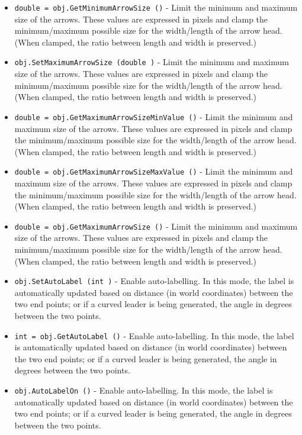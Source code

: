 \begin{itemize}
\item  \verb|double = obj.GetMinimumArrowSize ()| -  Limit the minimum and maximum size of the arrows. These values are
 expressed in pixels and clamp the minimum/maximum possible size for the
 width/length of the arrow head. (When clamped, the ratio between length
 and width is preserved.)

\item  \verb|obj.SetMaximumArrowSize (double )| -  Limit the minimum and maximum size of the arrows. These values are
 expressed in pixels and clamp the minimum/maximum possible size for the
 width/length of the arrow head. (When clamped, the ratio between length
 and width is preserved.)

\item  \verb|double = obj.GetMaximumArrowSizeMinValue ()| -  Limit the minimum and maximum size of the arrows. These values are
 expressed in pixels and clamp the minimum/maximum possible size for the
 width/length of the arrow head. (When clamped, the ratio between length
 and width is preserved.)

\item  \verb|double = obj.GetMaximumArrowSizeMaxValue ()| -  Limit the minimum and maximum size of the arrows. These values are
 expressed in pixels and clamp the minimum/maximum possible size for the
 width/length of the arrow head. (When clamped, the ratio between length
 and width is preserved.)

\item  \verb|double = obj.GetMaximumArrowSize ()| -  Limit the minimum and maximum size of the arrows. These values are
 expressed in pixels and clamp the minimum/maximum possible size for the
 width/length of the arrow head. (When clamped, the ratio between length
 and width is preserved.)

\item  \verb|obj.SetAutoLabel (int )| -  Enable auto-labelling. In this mode, the label is automatically updated
 based on distance (in world coordinates) between the two end points; or
 if a curved leader is being generated, the angle in degrees between the
 two points.

\item  \verb|int = obj.GetAutoLabel ()| -  Enable auto-labelling. In this mode, the label is automatically updated
 based on distance (in world coordinates) between the two end points; or
 if a curved leader is being generated, the angle in degrees between the
 two points.

\item  \verb|obj.AutoLabelOn ()| -  Enable auto-labelling. In this mode, the label is automatically updated
 based on distance (in world coordinates) between the two end points; or
 if a curved leader is being generated, the angle in degrees between the
 two points.


\end{itemize}
